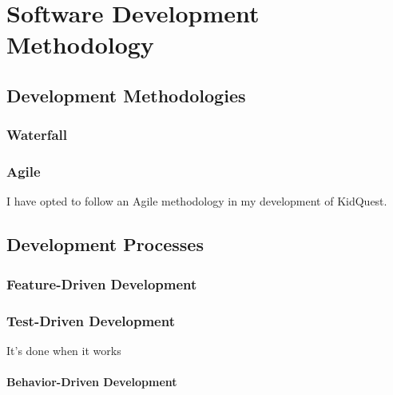 \chapter{Software Development Methodology}

\section{Development Methodologies}

\subsection{Waterfall}

\subsection{Agile}
I have opted to follow an Agile methodology in my development of KidQuest.


\section{Development Processes}

\subsection{Feature-Driven Development}

\subsection{Test-Driven Development}
It's done when it works

\subsubsection{Behavior-Driven Development}


